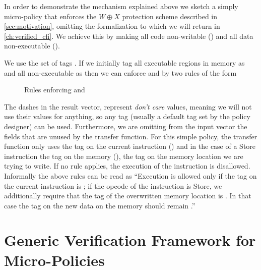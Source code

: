 
In order to demonstrate the mechanism explained above we sketch a
simply micro-policy that enforces the $W \oplus X$ protection scheme
described in \cref{sec:motivation}, omitting the formalization to
which we will return in \cref{ch:verified_cfi}. We achieve this by
making all code non-writable (\NWC) and all data non-executable
(\NXD).

We use the set of tags \TAGS{\DATA,\INSTRname}. If we initially tag
all executable regions in memory as \INSTRname and all non-executable
as \DATAname then we can enforce \NWC and \NXD by two rules of the form

\begin{figure}[htb!]
\bigskip

\bigskip

\caption{Rules enforcing \NWC and \NXD}
\end{figure}

The dashes in the result vector, represent \textit{don't care} values,
meaning we will not use their values for anything, so any tag (usually
a default tag set by the policy designer) can be used. Furthermore, we
are omitting from the input vector the fields that are unused by the
transfer function. For this simple policy, the transfer function only
uses the tag on the current instruction () and in the case of a
Store instruction the tag on the memory (), \IE the tag on the
memory location we are trying to write. If no rule applies, the
execution of the instruction is disallowed. Informally the above rules
can be read as ``Execution is allowed only if the tag on the current
instruction is \INSTRname; if the opcode of the instruction is Store,
we additionally require that the tag of the overwritten memory
location is \DATA. In that case the tag on the new data on the memory
should remain \DATA.''

\section{Generic Verification Framework for Micro-Policies}
\label{sec:framework}

